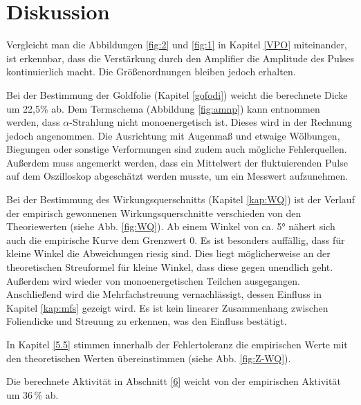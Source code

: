 \section{Diskussion}
Vergleicht man die Abbildungen \ref{fig:2} und \ref{fig:1} in Kapitel \ref{VPO} miteinander,
ist erkennbar, dass die Verstärkung durch den Amplifier die Amplitude des Pulses
kontinuierlich macht.
Die Größenordnungen bleiben jedoch erhalten.

Bei der Bestimmung der Goldfolie (Kapitel \ref{gofodi}) weicht die berechnete Dicke um 22,5\% ab.
Dem Termschema (Abbildung \ref{fig:amnp}) kann entnommen werden, dass $\alpha$-Strahlung nicht monoenergetisch ist.
Dieses wird in der Rechnung jedoch angenommen.
Die Ausrichtung mit Augenmaß und etwaige Wölbungen, Biegungen oder sonstige Verformungen sind zudem auch mögliche Fehlerquellen.
Außerdem muss angemerkt werden, dass ein Mittelwert der fluktuierenden Pulse auf dem Oszilloskop abgeschätzt werden musste, um ein Messwert aufzunehmen.

Bei der Bestimmung des Wirkungsquerschnitts (Kapitel \ref{kap:WQ}) ist der Verlauf der empirisch gewonnenen Wirkungsquerschnitte verschieden von den Theoriewerten (siehe Abb. \ref{fig:WQ}).
Ab einem Winkel von ca. 5° nähert sich auch die empirische Kurve dem Grenzwert 0.
Es ist besonders auffällig, dass für kleine Winkel die Abweichungen riesig sind.
Dies liegt möglicherweise an der theoretischen Streuformel für kleine Winkel, dass diese gegen unendlich geht.
Außerdem wird wieder von monoenergetischen Teilchen ausgegangen.
Anschließend wird die Mehrfachstreuung vernachlässigt, dessen Einfluss in Kapitel \ref{kap:mfs} gezeigt wird.
Es ist kein linearer Zusammenhang zwischen Foliendicke und Streuung zu erkennen, was den Einfluss bestätigt.

In Kapitel \ref{5.5} stimmen innerhalb der Fehlertoleranz die empirischen Werte mit den theoretischen Werten übereinstimmen (siehe Abb. \ref{fig:Z-WQ}).

Die berechnete Aktivität in Abschnitt \ref{6} weicht von der empirischen Aktivität um $36\,\%$ ab.
